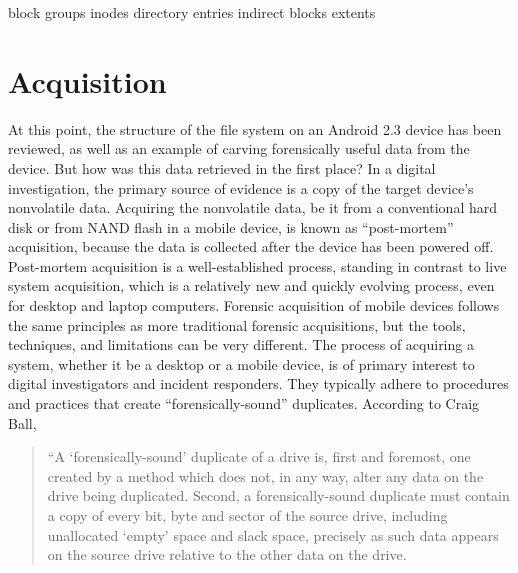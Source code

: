 block groups
inodes
directory entries
indirect blocks
extents


\section{Acquisition}
At this point, the structure of the file system on an Android 2.3 device has been reviewed, as well as an example of carving
forensically useful data from the device. But how was this data retrieved in the first place? In a digital investigation, the
primary source of evidence is a copy of the target device's nonvolatile data.  Acquiring the nonvolatile data, be it from a
conventional hard disk or from NAND flash in a mobile device, is known as ``post-mortem'' acquisition, because the data is
collected after the device has been powered off.  Post-mortem acquisition is a well-established process, standing in contrast to
live system acquisition, which is a relatively new and quickly evolving process, even for desktop and laptop computers.  Forensic
acquisition of mobile devices follows the same principles as more traditional forensic acquisitions, but the tools, techniques, and
limitations can be very different. The process of acquiring a system, whether it be a desktop or a mobile device, is of primary
interest to digital investigators and incident responders. They typically adhere to procedures and practices that create
``forensically-sound'' duplicates.  According to Craig Ball, 

\begin{quote}
“A ‘forensically-sound’ duplicate of a drive is, first and foremost, one created by a method which does not, in any way, alter any data on the drive being duplicated. 
Second, a forensically-sound duplicate must contain a copy of every bit, byte and sector of the source drive, including unallocated ‘empty’ space and slack space, precisely as such data appears on the source drive relative to the other data on the drive. 
\cite{ball}
\end{quote}

